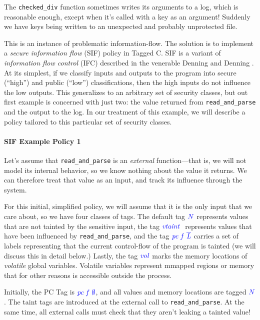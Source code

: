 \documentclass{llncs}
\begin{document}
The {\tt checked\_div} function sometimes writes its arguments to a log,
which is reasonable enough, except when it's called with a key as an argument!
Suddenly we have keys being written to an unexpected and probably unprotected file.

This is an instance of problematic information-flow. The solution is to implement
a {\em secure information flow} (SIF) policy in Tagged C. SIF is a variant of
{\em information flow control} (IFC) described in the venerable Denning and Denning
\cite{Denning77:SecureInformationFlow}. At its simplest, if we classify inputs and outputs to
the program into secure (``high'') and public (``low'') classifications, then the
high inputs do not influence the low outputs. This generalizes to an arbitrary set
of security classes, but out first example is concerned with just two: the value
returned from {\tt read\_and\_parse} and the output to the log.
In our treatment of this example, we will describe a policy tailored to this particular
set of security classes.

\paragraph*{SIF Example Policy 1}

Let's assume that {\tt read\_and\_parse} is an {\em external} function---that is, we will not
model its internal behavior, so we know nothing about the value it returns. We can therefore
treat that value as an input, and track its influence through the system.

For this initial, simplified policy, we will assume that it is the only input that we care about,
so we have four classes of tags. The default tag \({\color{blue} N}\) represents values that are not tainted
by the sensitive input, the tag \(\mathit{\color{blue} vtaint ~ }\) represents values that have been influenced by
{\tt read\_and\_parse}, and the tag \(\mathit{\color{blue} pc ~ f ~ \overline{L}}\) carries a set of labels
representing that the current control-flow of the program is tainted (we will discuss this in detail
below.) Lastly, the tag \(\mathit{\color{blue} vol}\) marks the memory locations of {\em volatile} global variables.
Volatile variables represent mmapped regions or memory that for other reasons is accessible
outside the process.

Initially, the PC Tag is \(\mathit{\color{blue} pc ~ f ~ \emptyset}\), and all values and memory locations are
tagged \({\color{blue} N}\). The taint tags are introduced at the external call to {\tt read\_and\_parse}.
At the same time, all external calls must check that they aren't leaking a tainted value!
\end{document}
